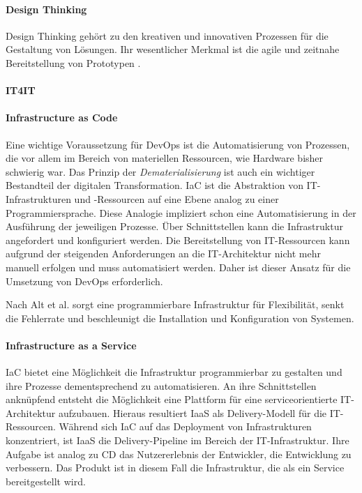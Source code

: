 \paragraph{Design Thinking}
Design Thinking gehört zu den kreativen und innovativen Prozessen für die Gestaltung von Lösungen. Ihr wesentlicher Merkmal ist die agile und zeitnahe Bereitstellung von Prototypen \cite{Alt2017}.

\paragraph{IT4IT}

\paragraph{Infrastructure as Code}
Eine wichtige Voraussetzung für DevOps ist die Automatisierung von Prozessen, die vor allem im Bereich von materiellen Ressourcen, wie Hardware bisher schwierig war. Das Prinzip der \emph{Dematerialisierung} ist auch ein wichtiger Bestandteil der digitalen Transformation.
\ac{IaC} ist die Abstraktion von IT-Infrastrukturen und -Ressourcen auf eine Ebene analog zu einer Programmiersprache. Diese Analogie impliziert schon eine Automatisierung in der Ausführung der jeweiligen Prozesse. Über Schnittstellen kann die Infrastruktur angefordert und konfiguriert werden. Die Bereitstellung von IT-Ressourcen kann aufgrund der steigenden Anforderungen an die IT-Architektur \cite{Brockhoff2006, Bussmann2006, Alt2017} nicht mehr manuell erfolgen und muss automatisiert werden. Daher ist dieser Ansatz für die Umsetzung von DevOps erforderlich.

Nach Alt et al. \cite{Alt2017} sorgt eine programmierbare Infrastruktur für Flexibilität, senkt die Fehlerrate und beschleunigt die Installation und Konfiguration von Systemen.

\paragraph{Infrastructure as a Service}
\ac{IaC} bietet eine Möglichkeit die Infrastruktur programmierbar zu gestalten und ihre Prozesse dementsprechend zu automatisieren. An ihre Schnittstellen anknüpfend entsteht die Möglichkeit eine Plattform für eine serviceorientierte IT-Architektur aufzubauen. Hieraus resultiert \ac{IaaS} als Delivery-Modell \cite{Alt2017} für die IT-Ressourcen. Während sich \ac{IaC} auf das Deployment von Infrastrukturen konzentriert, ist \ac{IaaS} die Delivery-Pipeline im Bereich der IT-Infrastruktur. Ihre Aufgabe ist analog zu \ac{CD} das Nutzererlebnis der Entwickler, die Entwicklung zu verbessern. Das Produkt ist in diesem Fall die Infrastruktur, die als ein Service bereitgestellt wird.

